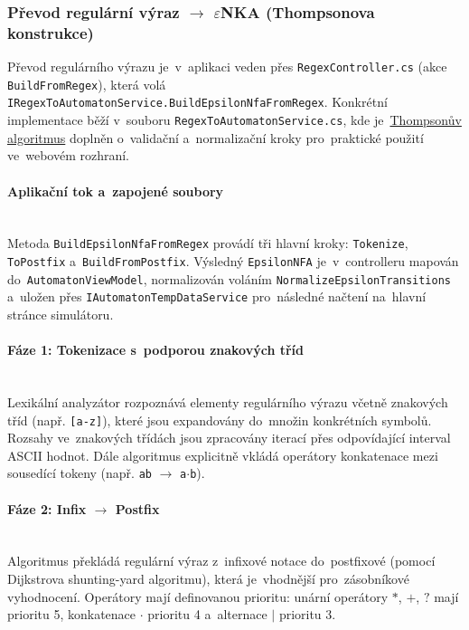 \documentclass[
  master,
  program=ainfvs,
  printversion,
  figures=false,
  tables=false,
  glossaries,
  index
]{kidiplom}
\begin{document}
\subsubsection{Převod regulární výraz $\rightarrow$ $\varepsilon$NKA (Thompsonova konstrukce)}
Převod regulárního výrazu je~v~aplikaci veden přes \texttt{RegexController.cs} (akce \texttt{BuildFromRegex}), která volá \texttt{IRegex\-To\-Automaton\-Service.Bui\-ld\-Ep\-si\-lon\-Nfa\-From\-Regex}. Konkrétní implementace běží v~souboru \texttt{Regex\-To\-Au\-to\-ma\-ton\-Ser\-vi\-ce.cs}, kde je~\hyperref[par:talg]{Thompsonův algoritmus} doplněn o~validační a~normalizační kroky pro~praktické použití ve~webovém rozhraní.

\paragraph{Aplikační tok a~zapojené soubory} \mbox{} \\
Metoda \texttt{BuildEpsilonNfaFromRegex} provádí tři hlavní kroky: \texttt{Tokenize}, \texttt{ToPostfix} a~\texttt{BuildFromPostfix}. Výsledný \texttt{EpsilonNFA} je~v~controlleru mapován do~\texttt{AutomatonViewModel}, normalizován voláním \texttt{Normalize\-Ep\-si\-lon\-Tran\-si\-ti\-ons} a~uložen přes \texttt{IAutomatonTempDataService} pro~následné načtení na~hlavní stránce simulátoru.

\paragraph{Fáze 1: Tokenizace s~podporou znakových tříd} \mbox{} \\
Lexikální analyzátor rozpoznává elementy regulárního výrazu včetně znakových tříd (např. \texttt{[a-z]}), které jsou expandovány do~množin konkrétních symbolů. Rozsahy ve~znakových třídách jsou zpracovány iterací přes odpovídající interval ASCII hodnot. Dále algoritmus explicitně vkládá operátory konkatenace mezi sousedící tokeny (např. \texttt{ab} $\rightarrow$ \texttt{a$\cdot$b}).

\paragraph{Fáze 2: Infix $\rightarrow$ Postfix} \mbox{} \\
Algoritmus překládá regulární výraz z~infixové notace do~postfixové (pomocí Dijkstrova shunting-yard algoritmu), která je~vhodnější pro~zásobníkové vyhodnocení. Operátory mají definovanou prioritu: unární operátory $*$, $+$, $?$ mají prioritu 5, konkatenace $\cdot$ prioritu 4 a~alternace $|$ prioritu 3.
\end{document}
